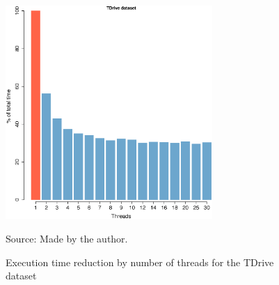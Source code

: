 {\begin{figure}[h!]
    \centering
    \caption{Execution time reduction by number of threads for the TDrive dataset}
    \centerline{\includegraphics[width=0.7\textwidth]{images/TDrive_thread.eps}}
    \footnotesize{Source: Made by the author.}
    \label{fig:tdrive_threads}
\end{figure}

}
